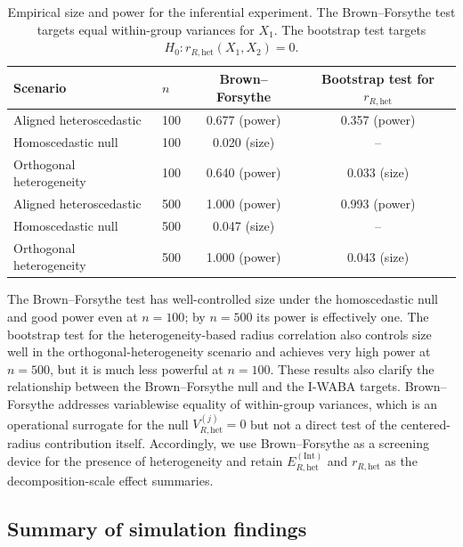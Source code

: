 \documentclass[preprint, times, 12pt, authoryear]{elsarticle}
\begin{document}
\begin{table}[ht]
	\centering
	\caption{Empirical size and power for the inferential experiment. The Brown--Forsythe test targets equal within-group variances for $X_1$. The bootstrap test targets $H_0:r_{R,\mathrm{het}}(X_1,X_2)=0$.}
	\label{tab:sim_inference_power}
	\begin{tabular}{llcc}
		\toprule
		Scenario & $n$ & Brown--Forsythe & Bootstrap test for $r_{R,\mathrm{het}}$ \\
		\midrule
		Aligned heteroscedastic & 100 & 0.677 (power) & 0.357 (power) \\
		Homoscedastic null      & 100 & 0.020 (size)  & -- \\
		Orthogonal heterogeneity& 100 & 0.640 (power) & 0.033 (size) \\
		\midrule
		Aligned heteroscedastic & 500 & 1.000 (power) & 0.993 (power) \\
		Homoscedastic null      & 500 & 0.047 (size)  & -- \\
		Orthogonal heterogeneity& 500 & 1.000 (power) & 0.043 (size) \\
		\bottomrule
	\end{tabular}
\end{table}

The Brown--Forsythe test has well-controlled size under the homoscedastic null and good power even at $n=100$; by $n=500$ its power is effectively one. The bootstrap test for the heterogeneity-based radius correlation also controls size well in the orthogonal-heterogeneity scenario and achieves very high power at $n=500$, but it is much less powerful at $n=100$. These results also clarify the relationship between the Brown--Forsythe null and the I-WABA targets. Brown--Forsythe addresses variablewise equality of within-group variances, which is an operational surrogate for the null $V_{R,\mathrm{het}}^{(j)}=0$ but not a direct test of the centered-radius contribution itself. Accordingly, we use Brown--Forsythe as a screening device for the presence of heterogeneity and retain $E_{R,\mathrm{het}}^{(\mathrm{Int})}$ and $r_{R,\mathrm{het}}$ as the decomposition-scale effect summaries.


\subsection{Summary of simulation findings}
\end{document}
